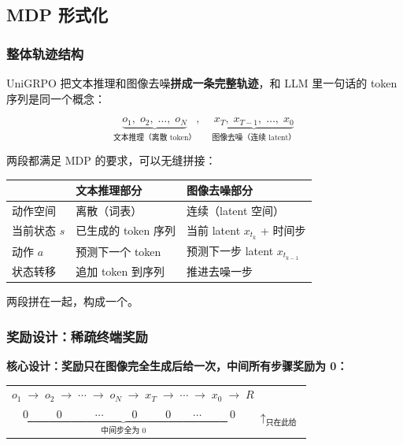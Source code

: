 \subsection{MDP 形式化}

\subsubsection{整体轨迹结构}

UniGRPO 把文本推理和图像去噪\textbf{拼成一条完整轨迹}，和 LLM 里一句话的 token 序列是同一个概念：

\[
\underbrace{o_1,\; o_2,\; \ldots,\; o_N}_{\text{文本推理（离散 token）}},\quad
\underbrace{x_T,\; x_{T-1},\; \ldots,\; x_0}_{\text{图像去噪（连续 latent）}}
\]

两段都满足 MDP 的要求，可以无缝拼接：

\begin{center}
{\small
\begin{tabular}{p{2.5cm}p{4.5cm}p{4.5cm}}
\hline
 & \textbf{文本推理部分} & \textbf{图像去噪部分} \\
\hline
动作空间 & 离散（词表） & 连续（latent 空间） \\
当前状态 $s$ & 已生成的 token 序列 & 当前 latent $x_{t_k}$ + 时间步 \\
动作 $a$ & 预测下一个 token & 预测下一步 latent $x_{t_{k-1}}$ \\
状态转移 & 追加 token 到序列 & 推进去噪一步 \\
\hline
\end{tabular}
}
\end{center}

两段拼在一起，构成一个。

\subsubsection{奖励设计：稀疏终端奖励}

\textbf{核心设计：奖励只在图像完全生成后给一次，中间所有步骤奖励为 0：}

\begin{center}
\begin{tabular}{p{13.5cm}}
$o_1 \;\to\; o_2 \;\to\; \cdots \;\to\; o_N \;\to\; x_T \;\to\; \cdots \;\to\; x_0 \;\to\; R$ \\[2pt]
$\underbrace{\quad 0 \qquad\;\; 0 \qquad\quad \cdots \qquad\;\; 0 \qquad\;\; 0 \qquad \cdots \qquad\;\; 0}_{\text{中间步全为 0}} \qquad \uparrow_{\text{只在此给}}$
\end{tabular}
\end{center}

